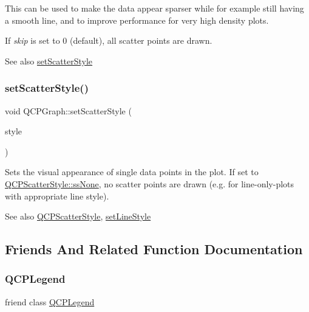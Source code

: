 This can be used to make the data appear sparser while for example still having a smooth line, and to improve performance for very high density plots.

If {\itshape skip} is set to 0 (default), all scatter points are drawn.

\begin{DoxySeeAlso}{See also}
\hyperlink{class_q_c_p_graph_a12bd17a8ba21983163ec5d8f42a9fea5}{set\+Scatter\+Style} 
\end{DoxySeeAlso}
\mbox{\label{class_q_c_p_graph_a12bd17a8ba21983163ec5d8f42a9fea5}} 
\subsubsection{\texorpdfstring{set\+Scatter\+Style()}{setScatterStyle()}}
{\footnotesize\ttfamily void Q\+C\+P\+Graph\+::set\+Scatter\+Style (\begin{DoxyParamCaption}\item[{const \hyperlink{class_q_c_p_scatter_style}{Q\+C\+P\+Scatter\+Style} \&}]{style }\end{DoxyParamCaption})}

Sets the visual appearance of single data points in the plot. If set to \hyperlink{class_q_c_p_scatter_style_adb31525af6b680e6f1b7472e43859349abd144c291ca274f77053ec68cab6c022}{Q\+C\+P\+Scatter\+Style\+::ss\+None}, no scatter points are drawn (e.\+g. for line-\/only-\/plots with appropriate line style).

\begin{DoxySeeAlso}{See also}
\hyperlink{class_q_c_p_scatter_style}{Q\+C\+P\+Scatter\+Style}, \hyperlink{class_q_c_p_graph_a513fecccff5b2a50ce53f665338c60ff}{set\+Line\+Style} 
\end{DoxySeeAlso}


\subsection{Friends And Related Function Documentation}
\mbox{\label{class_q_c_p_graph_a8429035e7adfbd7f05805a6530ad5e3b}} 
\subsubsection{\texorpdfstring{Q\+C\+P\+Legend}{QCPLegend}}
{\footnotesize\ttfamily friend class \hyperlink{class_q_c_p_legend}{Q\+C\+P\+Legend}\hspace{0.3cm}{\ttfamily [friend]}}

